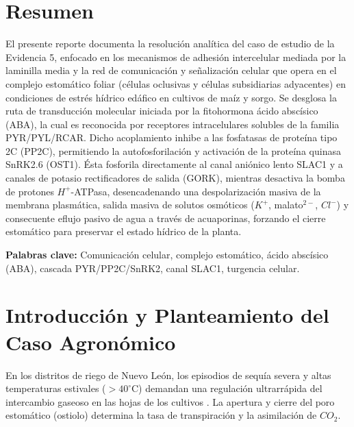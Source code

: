 \documentclass[12pt,spanish,letterpaper,oneside]{article}
\begin{document}
\hypersetup{pageanchor=false}
\begingroup
\fontsize{14}{17}\selectfont
\renewcommand{\Huge}{\fontsize{14}{17}\selectfont\bfseries}
\renewcommand{\large}{\fontsize{14}{17}\selectfont}
\templatePortrait
\clearpage
\endgroup
\hypersetup{pageanchor=true}
\templatePagecfg
\singlespacing
\setlength{\tabcolsep}{8pt}
\renewcommand{\arraystretch}{1.18}

\section*{Resumen}
El presente reporte documenta la resolución analítica del caso de estudio de la Evidencia 5, enfocado en los mecanismos de adhesión intercelular mediada por la laminilla media y la red de comunicación y señalización celular que opera en el complejo estomático foliar (células oclusivas y células subsidiarias adyacentes) en condiciones de estrés hídrico edáfico en cultivos de maíz y sorgo. Se desglosa la ruta de transducción molecular iniciada por la fitohormona ácido abscísico (ABA), la cual es reconocida por receptores intracelulares solubles de la familia PYR/PYL/RCAR. Dicho acoplamiento inhibe a las fosfatasas de proteína tipo 2C (PP2C), permitiendo la autofosforilación y activación de la proteína quinasa SnRK2.6 (OST1). Ésta fosforila directamente al canal aniónico lento SLAC1 y a canales de potasio rectificadores de salida (GORK), mientras desactiva la bomba de protones $H^+$-ATPasa, desencadenando una despolarización masiva de la membrana plasmática, salida masiva de solutos osmóticos ($K^+$, malato$^{2-}$, $Cl^-$) y consecuente eflujo pasivo de agua a través de acuaporinas, forzando el cierre estomático para preservar el estado hídrico de la planta.

\vspace{0.4cm}
\noindent\textbf{Palabras clave:} Comunicación celular, complejo estomático, ácido abscísico (ABA), cascada PYR/PP2C/SnRK2, canal SLAC1, turgencia celular.

\section{Introducción y Planteamiento del Caso Agronómico}
En los distritos de riego de Nuevo León, los episodios de sequía severa y altas temperaturas estivales ($>40^\circ\text{C}$) demandan una regulación ultrarrápida del intercambio gaseoso en las hojas de los cultivos \parencite{taiz2015}. La apertura y cierre del poro estomático (ostiolo) determina la tasa de transpiración y la asimilación de $CO_2$.
\end{document}
